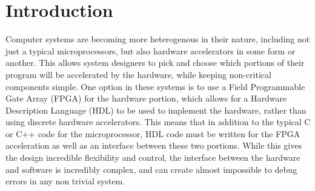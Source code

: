 \chapter{Introduction}
Computer systems are becoming more heterogenous in their nature, including not just a typical microprocessors, but also hardware accelerators in some form or another. This allows system designers to pick and choose which portions of their program will be accelerated by the hardware, while keeping non-critical components simple. 
One option in these systems is to use a Field Programmable Gate Array (FPGA) for the hardware portion, which allows for a Hardware Description Language (HDL) to be used to implement the hardware, rather than using discrete hardware accelerators. This means that in addition to the typical C or C++ code for the microprocessor, HDL code must be written for the FPGA acceleration as well as an interface between these two portions. While this gives the design incredible flexibility and control, the interface between the hardware and software is incredibly complex, and can create almost impossible to debug errors in any non trivial system. 